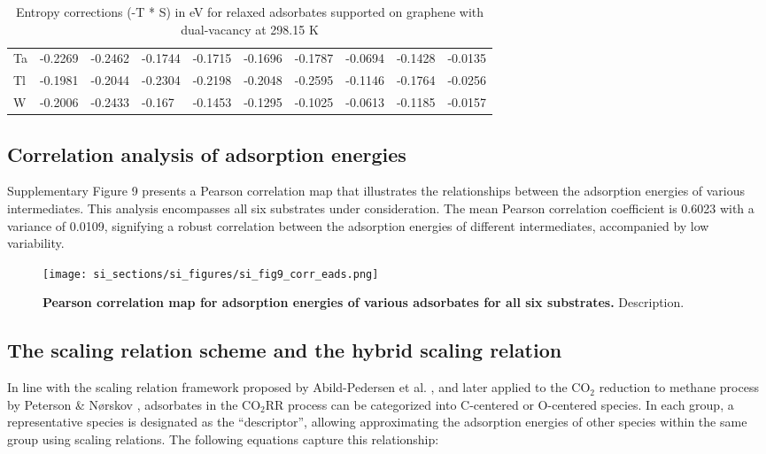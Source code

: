 \begin{table}[h]
{\begin{tabular}{*{10}{l}}
      Ta & -0.2269 & -0.2462 & -0.1744 & -0.1715 & -0.1696 & -0.1787 & -0.0694 & -0.1428 & -0.0135 \\
      Tl & -0.1981 & -0.2044 & -0.2304 & -0.2198 & -0.2048 & -0.2595 & -0.1146 & -0.1764 & -0.0256 \\
      W  & -0.2006 & -0.2433 & -0.167  & -0.1453 & -0.1295 & -0.1025 & -0.0613 & -0.1185 & -0.0157 \\
      \hline
  \end{tabular}
  }
  \caption{Entropy corrections (-T * S) in eV for relaxed adsorbates supported on graphene with dual-vacancy at 298.15 K}
  \label{si_table12}
\end{table}


\subsection{Correlation analysis of adsorption energies}


Supplementary Figure 9 presents a Pearson correlation map that illustrates the relationships between the adsorption energies of various intermediates. This analysis encompasses all six substrates under consideration. The mean Pearson correlation coefficient is 0.6023 with a variance of 0.0109, signifying a robust correlation between the adsorption energies of different intermediates, accompanied by low variability.

\begin{figure}
  \centering
  \texttt{[image: si\_sections/si\_figures/si\_fig9\_corr\_eads.png]}
  \caption{\textbf{Pearson correlation map for adsorption energies of various adsorbates for all six substrates.}
  Description.}
  \label{si_fig9:corr_eads}
\end{figure}


\subsection{The scaling relation scheme and the hybrid scaling relation}


In line with the scaling relation framework proposed by Abild-Pedersen et al. \cite{abild2007scaling},
and later applied to the CO$_2$ reduction to methane process by Peterson \& Nørskov \cite{peterson2012activity},
adsorbates in the CO$_2$RR process can be categorized into C-centered or O-centered species.
In each group, a representative species is designated as the “descriptor”, allowing approximating the adsorption energies of other species within the same group using scaling relations.
The following equations capture this relationship:

